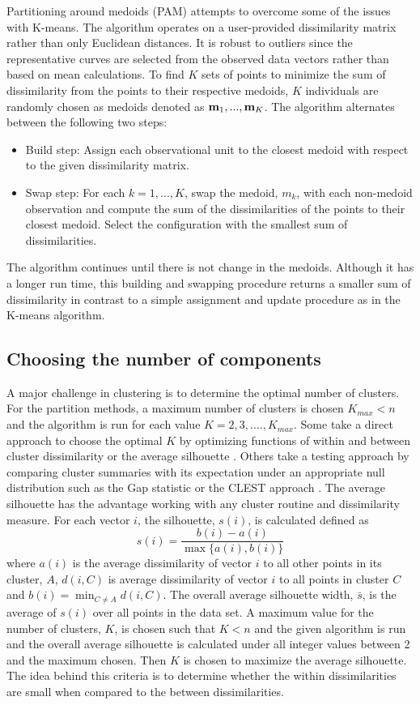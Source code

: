 Partitioning around medoids (PAM) attempts to overcome some of the issues with K-means. The algorithm operates on a user-provided dissimilarity matrix rather than only Euclidean distances. It is robust to outliers since the representative curves are selected from the observed data vectors rather than based on mean calculations. To find $K$ sets of points to minimize the sum of dissimilarity from the points to their respective medoids, $K$ individuals are randomly chosen as medoids denoted as $\mathbf m_{1},...,\mathbf m_{K}$. The algorithm alternates between the following two steps:
 \begin{itemize}
\item Build step: Assign each observational unit to the closest medoid with respect to the given dissimilarity matrix.
\item Swap step: For each $k=1,...,K$, swap the medoid, $m_{k}$, with each non-medoid observation and compute the sum of the dissimilarities of the points to their closest medoid. Select the configuration with the smallest sum of dissimilarities.
\end{itemize}
The algorithm continues until there is not change in the medoids. Although it has a longer run time, this building and swapping procedure returns a smaller sum of dissimilarity in contrast to a simple assignment and update procedure as in the K-means algorithm. 

\subsection{Choosing the number of components}
A major challenge in clustering is to determine the optimal number of clusters. For the partition methods, a maximum number of clusters is chosen $K_{max}<n$ and the algorithm is run for each value $K=2,3,....,K_{max}$. Some take a direct approach to choose the optimal $K$  by optimizing functions of within and between cluster dissimilarity \cite{mulligan1985} or the average silhouette \cite{kaufman1990}. Others take a testing approach by comparing cluster summaries with its expectation under an appropriate null distribution such as the Gap statistic \cite{tibshirani2001} or the CLEST approach \cite{dudoit2002}. The average silhouette has the advantage working with any cluster routine and dissimilarity measure. For each vector $i$, the silhouette, $s(i)$, is calculated defined as
$$s(i)=\frac{b(i)-a(i)}{\max\{a(i),b(i)\}}$$
where $a(i)$ is the average dissimilarity of vector $i$ to all other points in its cluster, $A$, $d(i,C)$ is average dissimilarity of vector $i$ to all points in cluster $C$ and $b(i)=\min_{C\not= A} d(i,C)$. The overall average silhouette width, $\bar{s}$, is the average of $s(i)$ over all points in the data set. A maximum value for the number of clusters, $K$, is chosen such that $K<n$ and the given algorithm is run and the overall average silhouette is calculated under all integer values between 2 and the maximum chosen. Then $K$ is chosen to maximize the average silhouette. The idea behind this criteria is to determine whether the within dissimilarities are small when compared to the between dissimilarities. 

